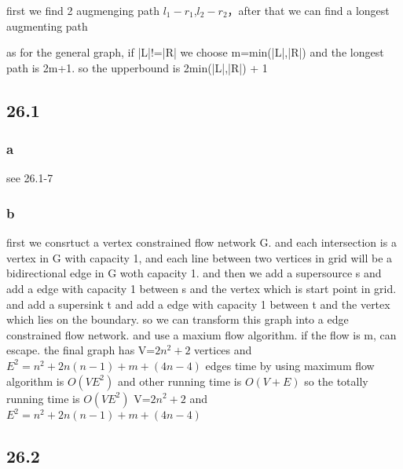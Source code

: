 \documentclass[a4paper,UTF8]{article}
\theoremstyle{definition}
\begin{document}
first we find 2 augmenging path $l_1-r_1$,$l_2-r_2$，after that we can find a longest  augmenting path

as for the general graph, if |L|!=|R| we choose m=min(|L|,|R|) and the longest path is
2m+1. so the upperbound is 2min(|L|,|R|) + 1

\subsection*{26.1}
\subsubsection*{a}
see 26.1-7
\subsubsection*{b}
first we consrtuct a vertex constrained flow network G. and each intersection is a vertex in
G with capacity 1, and each line between two vertices in grid will be a bidirectional edge in G woth capacity 1.
and then we add a supersource  s and add a edge with capacity 1 between s and the vertex which is start  point in grid.
and add a supersink t and add a edge with capacity 1 between t and the vertex which lies on the boundary.
so we can transform this graph into a edge constrained flow network. and use a maxium flow algorithm.
if the flow is m, can escape. the final graph has V=$2n^2+2$ vertices and $E^2=n^2+2n(n-1)+m+(4n-4)$ edges
time by using  maximum flow algorithm is $O(VE^2)$ and other running time is $O(V+E)$
so the totally running time is $O(VE^2)$ V=$2n^2+2$  and $E^2=n^2+2n(n-1)+m+(4n-4)$

\subsection*{26.2}
\end{document}
